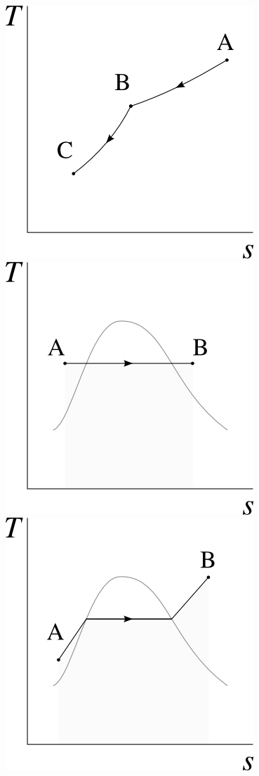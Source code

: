 \begin{description}
						\includegraphics[width=\solutiondiagramwidth]{images/exo_sol_ts_multiples2.png}
						\includegraphics[width=\solutiondiagramwidth]{images/exo_sol_ts_multiples3.png}
						\includegraphics[width=\solutiondiagramwidth]{images/exo_sol_ts_multiples4.png}

\end{description}
